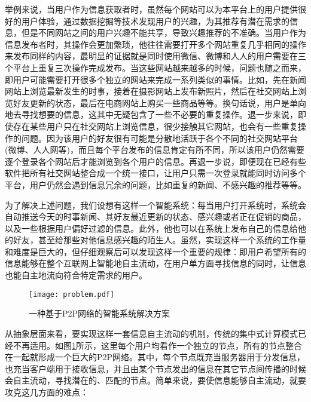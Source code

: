 举例来说，当用户作为信息获取者时，虽然每个网站可以为本平台上的用户提供很好的用户体验，通过数据挖掘等技术发现用户的兴趣，为其推荐有潜在需求的信息，但是不同网站之间的用户兴趣不能共享，导致兴趣推荐的不准确。当用户作为信息发布者时，其操作会更加繁琐，他往往需要打开多个网站重复几乎相同的操作来发布同样的内容，最明显的证据就是同时使用微信、微博和人人的用户需要在三个平台上重复三次操作完成发布。当这些网站越来越多的时候，问题也随之而来，即用户可能需要打开很多个独立的网站来完成一系列类似的事情。比如，先在新闻网站上浏览最新发生的时事，接着在摄影网站上发布新照片，然后在社交网站上浏览好友更新的状态，最后在电商网站上购买一些商品等等。换句话说，用户是单向地去寻找想要的信息，这其中无疑包含了一些不必要的重复操作。退一步来说，即使存在某些用户只在社交网站上浏览信息，很少接触其它网站，也会有一些重复操作的问题。因为该用户的好友很有可能是分散地活跃于各个不同的社交网站平台(微博、人人网等)，而且每个平台发布的信息肯定有所不同，所以该用户仍然需要逐个登录各个网站后才能浏览到各个用户的信息。再退一步说，即便现在已经有些软件把所有社交网站整合成一个统一接口，让用户只需一次登录就能同时访问多个平台，用户仍然会遇到信息冗余的问题，比如重复的新闻、不感兴趣的推荐等等。

为了解决上述问题，我们设想有这样一个智能系统：每当用户打开系统时，系统会自动推送今天的时事新闻、其好友最近更新的状态、感兴趣或者正在促销的商品，以及一些根据用户偏好过滤的信息。此外，他也可以在系统上发布自己的信息给他的好友，甚至给那些对他信息感兴趣的陌生人。虽然，实现这样一个系统的工作量和难度是巨大的，但仔细观察后可以发现这样一个重要的规律：即用户希望所有的信息能够在整个互联网上智能地自主流动，在用户单方面寻找信息的同时，让信息也能自主地流向符合特定需求的用户。

\begin{figure}[ht]
\centering
\texttt{[image: problem.pdf]}
\caption{一种基于P2P网络的智能系统解决方案}
\label{fig:solution}
\end{figure}

从抽象层面来看，要实现这样一套信息自主流动的机制，传统的集中式计算模式已经不再适用。如图\ref{fig:solution}所示，这里每个用户均看作一个独立的节点，所有的节点整合在一起就形成一个巨大的P2P网络。其中，每个节点既充当服务器用于分发信息，也充当客户端用于接收信息，并且由某个节点发出的信息在其它节点间传播的时候会自主流动，寻找潜在的、匹配的节点。简单来说，要使信息能够自主流动，就要攻克这几方面的难点：

